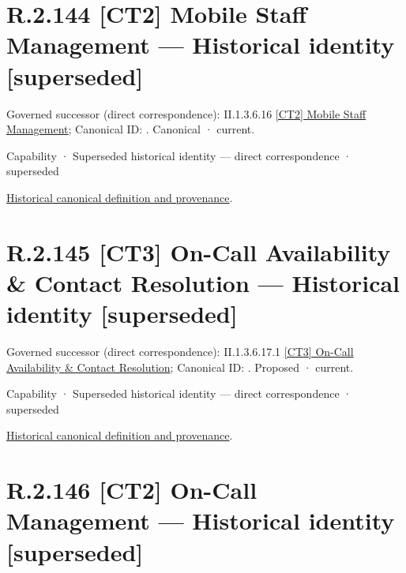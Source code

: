 \section*{R.2.144 [CT2] Mobile Staff Management — Historical identity [superseded]}
\label{navigation:R.2.144}

{\small Governed successor (direct correspondence): II.1.3.6.16 \hyperref[element:79a4a48fddf74c69acf7e16404d06ea5]{[CT2] Mobile Staff Management}; Canonical ID: \texttt{}. Canonical · current.}\par
\label{element:32118856636f400a95fc28daacea61c8}
{\small Capability · Superseded historical identity — direct correspondence · superseded}\par
\href{../../../../../../../continuum/strategy/capability/32118856636f400a95fc28daacea61c8.md}{Historical canonical definition and provenance}.\par
\section*{R.2.145 [CT3] On-Call Availability \& Contact Resolution — Historical identity [superseded]}
\label{navigation:R.2.145}

{\small Governed successor (direct correspondence): II.1.3.6.17.1 \hyperref[element:677a816c42414ea694791b4ee5a14285]{[CT3] On-Call Availability \& Contact Resolution}; Canonical ID: \texttt{}. Proposed · current.}\par
\label{element:a03075a46f75497f8c6ba95d9c9e27c4}
{\small Capability · Superseded historical identity — direct correspondence · superseded}\par
\href{../../../../../../../continuum/strategy/capability/a03075a46f75497f8c6ba95d9c9e27c4.md}{Historical canonical definition and provenance}.\par
\section*{R.2.146 [CT2] On-Call Management — Historical identity [superseded]}
\label{navigation:R.2.146}

